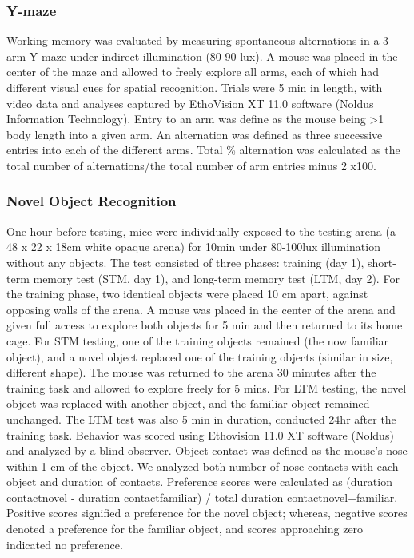 \subsubsection{Y-maze}
Working memory was evaluated by measuring spontaneous
alternations in a 3-arm Y-maze under indirect illumination (80-90 lux). A mouse
was placed in the center of the maze and allowed to freely explore all arms,
each of which had different visual cues for spatial recognition. Trials were 5
min in length, with video data and analyses captured by EthoVision XT 11.0
software (Noldus Information Technology). Entry to an arm was define as the
mouse being >1 body length into a given arm. An alternation was defined as three
successive entries into each of the different arms. Total \% alternation was
calculated as the total number of alternations/the total number of arm entries
minus 2 x100.  

\subsubsection{Novel Object Recognition}
One hour before testing, mice were individually exposed to the testing arena (a 48 x 22 x 18cm white opaque arena)
for 10min under 80-100lux illumination without any objects. The test consisted
of three phases: training (day 1), short-term memory test (STM, day 1), and
long-term memory test (LTM, day 2). For the training phase, two identical
objects were placed 10 cm apart, against opposing walls of the arena. A mouse
was placed in the center of the arena and given full access to explore both
objects for 5 min and then returned to its home cage. For STM testing, one of
the training objects remained (the now familiar object), and a novel object
replaced one of the training objects (similar in size, different shape). The
mouse was returned to the arena 30 minutes after the training task and allowed
to explore freely for 5 mins. For LTM testing, the novel object was replaced
with another object, and the familiar object remained unchanged. The LTM test
was also 5 min in duration, conducted 24hr after the training task. Behavior was
scored using Ethovision 11.0 XT software (Noldus) and analyzed by a blind
observer. Object contact was defined as the mouse’s nose within 1 cm of the
object. We analyzed both number of nose contacts with each object and duration
of contacts. Preference scores were calculated as (duration contactnovel -
duration contactfamiliar) / total duration contactnovel+familiar. Positive
scores signified a preference for the novel object; whereas, negative scores
denoted a preference for the familiar object, and scores approaching zero
indicated no preference.  

